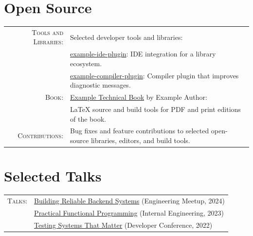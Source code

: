 \documentclass[a4paper,11pt]{article}
\begin{document}
\section{Open Source}
\begin{tabular}{r p{}}
  \textsc{Tools and Libraries:}& Selected developer tools and libraries:\\
  &\faGithub{} \href{https://github.com/example/ide-plugin}{example-ide-plugin}: IDE integration for a library ecosystem.\\
  &\faGithub{} \href{https://github.com/example/compiler-plugin}{example-compiler-plugin}: Compiler plugin that improves diagnostic messages.\\[0.35em]
  \textsc{Book:}& \faGithub{} \href{https://github.com/example/book}{Example Technical Book} by Example Author:\\
  &\LaTeX{} source and build tools for PDF and print editions of the book.\\[0.35em]
  \textsc{Contributions:}& Bug fixes and feature contributions to selected open-source libraries, editors, and build tools.
\end{tabular}

\section{Selected Talks}
\begin{tabular}{rl}
  \textsc{Talks:}&\faYoutubePlay{} \href{https://example.com}{Building Reliable Backend Systems} (Engineering Meetup, 2024)\\
  &\faYoutubePlay{} \href{https://example.com}{Practical Functional Programming} (Internal Engineering, 2023)\\
  &\faYoutubePlay{} \href{https://example.com}{Testing Systems That Matter} (Developer Conference, 2022)\\
\end{tabular}

\endgroup
\end{document}
